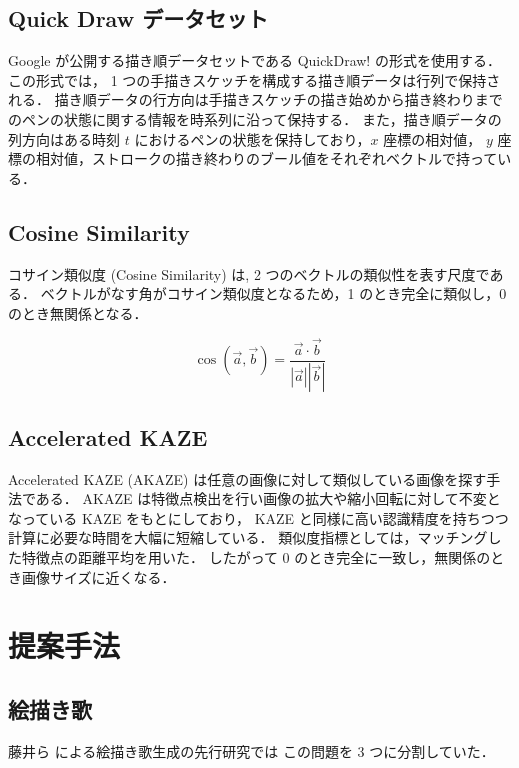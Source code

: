 \documentclass[twocolumn]{jarticle}     %
\begin{document}
	\subsection{Quick Draw データセット}
		Google が公開する描き順データセットである QuickDraw! \cite{Cheema:2012:QID:2207676.2208550} の形式を使用する．
		この形式では， 1 つの手描きスケッチを構成する描き順データは行列で保持される．
		描き順データの行方向は手描きスケッチの描き始めから描き終わりまでのペンの状態に関する情報を時系列に沿って保持する．
		また，描き順データの列方向はある時刻 $t$ におけるペンの状態を保持しており，$x$ 座標の相対値， $y$ 座標の相対値，ストロークの描き終わりのブール値をそれぞれベクトルで持っている．

    \subsection{Cosine Similarity}
コサイン類似度 (Cosine Similarity) は, 2 つのベクトルの類似性を表す尺度である．
ベクトルがなす角がコサイン類似度となるため，1 のとき完全に類似し，0 のとき無関係となる．

\begin{equation}
  \cos( \overrightarrow{a}, \overrightarrow{b} ) =
  \frac{\overrightarrow{a} \cdot \overrightarrow{b}}{|\overrightarrow{a}| |\overrightarrow{b}|}
\end{equation}

    \subsection{Accelerated KAZE}
    Accelerated KAZE (AKAZE) \cite{alcantarilla2011fast} は任意の画像に対して類似している画像を探す手法である．
    AKAZE は特徴点検出を行い画像の拡大や縮小回転に対して不変となっている KAZE をもとにしており，
    KAZE と同様に高い認識精度を持ちつつ計算に必要な時間を大幅に短縮している．
    類似度指標としては，マッチングした特徴点の距離平均を用いた．
    したがって 0 のとき完全に一致し，無関係のとき画像サイズに近くなる．


\section{提案手法}

\subsection{絵描き歌}
藤井ら \cite{fujii} による絵描き歌生成の先行研究では
この問題を 3 つに分割していた．
\end{document}
